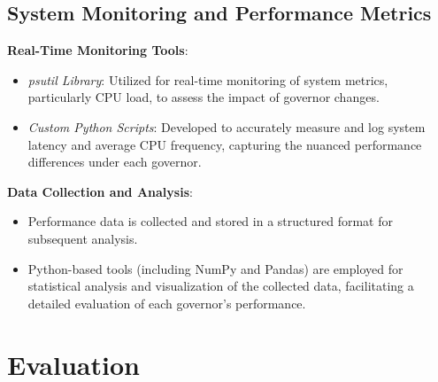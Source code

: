 \documentclass[conference]{IEEEtran}
\begin{document}
\subsection{System Monitoring and Performance Metrics}
\textbf{Real-Time Monitoring Tools}:
\begin{itemize}
    \item \textit{psutil Library}: Utilized for real-time monitoring of system metrics, particularly CPU load, to assess the impact of governor changes.
    \item \textit{Custom Python Scripts}: Developed to accurately measure and log system latency and average CPU frequency, capturing the nuanced performance differences under each governor.
\end{itemize}

\textbf{Data Collection and Analysis}:
\begin{itemize}
    \item Performance data is collected and stored in a structured format for subsequent analysis.
    \item Python-based tools (including NumPy and Pandas) are employed for statistical analysis and visualization of the collected data, facilitating a detailed evaluation of each governor's performance.
\end{itemize}

\section{Evaluation}

\end{document}
